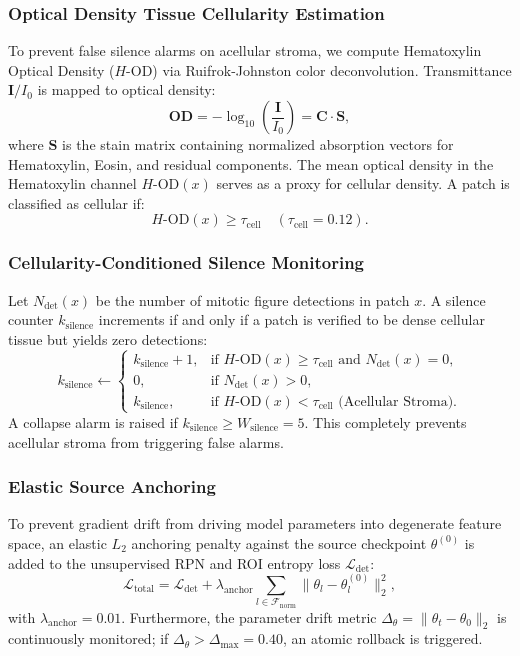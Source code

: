 \documentclass[conference]{IEEEtran}
\begin{document}
\subsubsection{Optical Density Tissue Cellularity Estimation}
To prevent false silence alarms on acellular stroma, we compute Hematoxylin Optical Density ($H\text{-OD}$) via Ruifrok-Johnston color deconvolution. Transmittance $\mathbf{I} / I_0$ is mapped to optical density:
\begin{equation}
    \mathbf{OD} = -\log_{10}\left(\frac{\mathbf{I}}{I_0}\right) = \mathbf{C} \cdot \mathbf{S},
\end{equation}
where $\mathbf{S}$ is the stain matrix containing normalized absorption vectors for Hematoxylin, Eosin, and residual components. The mean optical density in the Hematoxylin channel $H\text{-OD}(x)$ serves as a proxy for cellular density. A patch is classified as cellular if:
\begin{equation}
    H\text{-OD}(x) \ge \tau_{\text{cell}} \quad (\tau_{\text{cell}} = 0.12).
\end{equation}

\subsubsection{Cellularity-Conditioned Silence Monitoring}
Let $N_{\text{det}}(x)$ be the number of mitotic figure detections in patch $x$. A silence counter $k_{\text{silence}}$ increments if and only if a patch is verified to be dense cellular tissue but yields zero detections:
\begin{equation}
    k_{\text{silence}} \leftarrow 
    \begin{cases}
        k_{\text{silence}} + 1, & \text{if } H\text{-OD}(x) \ge \tau_{\text{cell}} \text{ and } N_{\text{det}}(x) = 0, \\
        0, & \text{if } N_{\text{det}}(x) > 0, \\
        k_{\text{silence}}, & \text{if } H\text{-OD}(x) < \tau_{\text{cell}} \text{ (Acellular Stroma)}.
    \end{cases}
\end{equation}
A collapse alarm is raised if $k_{\text{silence}} \ge W_{\text{silence}} = 5$. This completely prevents acellular stroma from triggering false alarms.

\subsubsection{Elastic Source Anchoring}
To prevent gradient drift from driving model parameters into degenerate feature space, an elastic $L_2$ anchoring penalty against the source checkpoint $\theta^{(0)}$ is added to the unsupervised RPN and ROI entropy loss $\mathcal{L}_{\text{det}}$:
\begin{equation}
    \mathcal{L}_{\text{total}} = \mathcal{L}_{\text{det}} + \lambda_{\text{anchor}} \sum_{l \in \mathcal{F}_{\text{norm}}} \|\theta_l - \theta_l^{(0)}\|_2^2,
\end{equation}
with $\lambda_{\text{anchor}} = 0.01$. Furthermore, the parameter drift metric $\Delta_\theta = \|\theta_t - \theta_0\|_2$ is continuously monitored; if $\Delta_\theta > \Delta_{\text{max}} = 0.40$, an atomic rollback is triggered.
\end{document}
